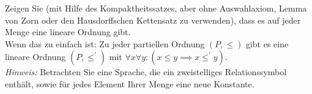 
\begin{exercise}[133]

Zeigen Sie (mit Hilfe des Kompaktheitssatzes, aber ohne Auswahlaxiom, Lemma von Zorn
oder den Hausdorffschen Kettensatz zu verwenden), dass es auf jeder Menge eine
lineare Ordnung gibt. \\
Wenn das zu einfach ist: Zu jeder partiellen Ordnung $(P,\leq)$ gibt es eine
lineare Ordnung $(P,\leq^{\prime})$ mit $\forall x \forall y: (x \leq y \implies x \leq^{\prime} y)$. \\
\textit{Hinweis:} Betrachten Sie eine Sprache, die ein zweistelliges Relationssymbol
enthält, sowie für jedes Element Ihrer Menge eine neue Konstante.

\end{exercise}


\begin{solution}

\phantom{}

\end{solution}

